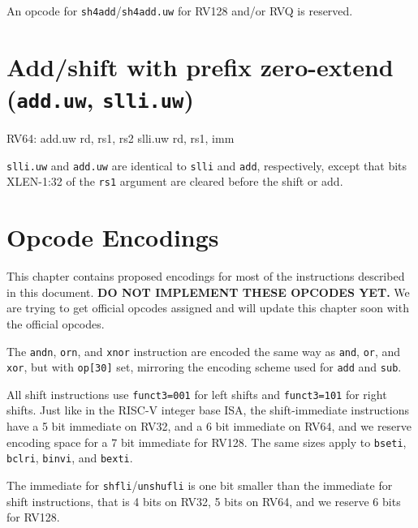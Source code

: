 

An opcode for {\tt sh4add}/{\tt sh4add.uw} for RV128 and/or RVQ is reserved.


\section{Add/shift with prefix zero-extend ({\tt add.uw}, {\tt slli.uw})}

\begin{rvb}
  RV64:
    add.uw rd, rs1, rs2
    slli.uw rd, rs1, imm
\end{rvb}

{\tt slli.uw} and {\tt add.uw} are identical to {\tt slli} and {\tt add}, respectively,
except that bits XLEN-1:32 of the {\tt rs1} argument are cleared before the shift or add.





\section{Opcode Encodings}
\label{opcodes}

This chapter contains proposed encodings for most of the instructions described
in this document. {\bf DO NOT IMPLEMENT THESE OPCODES YET.} We are trying to get
official opcodes assigned and will update this chapter soon with the official
opcodes.

The {\tt andn}, {\tt orn}, and {\tt xnor} instruction are encoded the same way
as {\tt and}, {\tt or}, and {\tt xor}, but with {\tt op[30]} set, mirroring the
encoding scheme used for {\tt add} and {\tt sub}.

All shift instructions use {\tt funct3=001} for left shifts and {\tt funct3=101}
for right shifts. Just like in the RISC-V integer base ISA, the shift-immediate
instructions have a 5 bit immediate on RV32, and a 6 bit immediate on RV64, and we
reserve encoding space for a 7 bit immediate for RV128.  The same sizes apply
to {\tt bseti}, {\tt bclri}, {\tt binvi}, and {\tt bexti}.

The immediate for {\tt shfli}/{\tt unshufli} is one bit smaller than the immediate
for shift instructions, that is 4 bits on RV32, 5 bits on RV64, and we reserve 6
bits for RV128.

